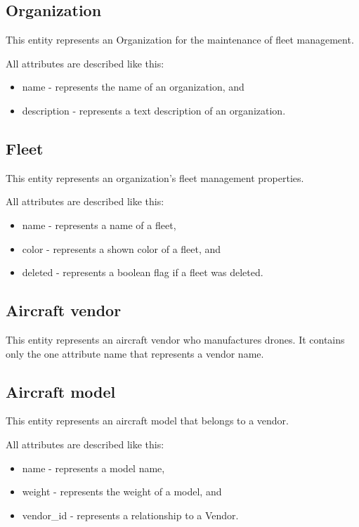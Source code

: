 \subsection{Organization}\label{subsec:organization}
This entity represents an Organization for the maintenance of fleet management.

All attributes are described like this:
\begin{itemize}
    \item name - represents the name of an organization, and
    \item description - represents a text description of an organization.
\end{itemize}

\subsection{Fleet}\label{subsec:fleet}
This entity represents an organization's fleet management properties.

All attributes are described like this:
\begin{itemize}
    \item name - represents a name of a fleet,
    \item color - represents a shown color of a fleet, and
    \item deleted - represents a boolean flag if a fleet was deleted.
\end{itemize}

\subsection{Aircraft vendor}\label{subsec:aircraft-vendor}
This entity represents an aircraft vendor who manufactures drones.
It contains only the one attribute name that represents a vendor name.

\subsection{Aircraft model}\label{subsec:aircraft-model}
This entity represents an aircraft model that belongs to a vendor.

All attributes are described like this:
\begin{itemize}
    \item name - represents a model name,
    \item weight - represents the weight of a model, and
    \item vendor\_id - represents a relationship to a Vendor.
\end{itemize}

